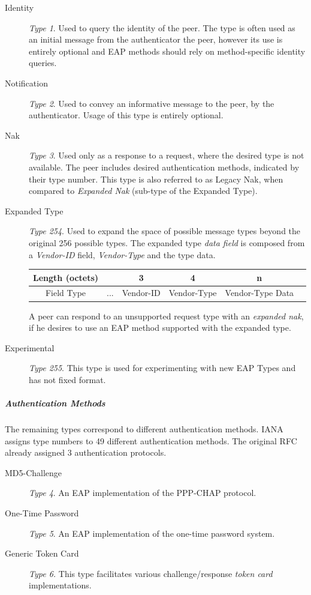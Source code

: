 \begin{description}
	\item[Identity] \textit{Type 1}. Used to query the identity of the peer. The type is often used as an initial message from the authenticator the peer, however its use is entirely optional and EAP methods should rely on method-specific identity queries.
	
	\item[Notification]\textit{Type 2}. Used to convey an informative message to the peer, by the authenticator. Usage of this type is entirely optional.
	\item[Nak]\textit{Type 3}. Used only as a response to a request, where the desired type is not available.
	The peer includes desired authentication methods, indicated by their type number.
	This type is also referred to as Legacy Nak, when compared to \textit{Expanded Nak} (sub-type of the Expanded Type).
	\item[Expanded Type] \textit{Type 254}. 
	Used to expand the space of possible message types beyond the original 256 possible types.
	The expanded type \textit{data field} is composed from a \textit{Vendor-ID} field, \textit{Vendor-Type} and the type data.
	\bigskip
	\begin{center}
		\begin{tabular}{|c|c|c|c|c|c|}
		\cline{2-5}
		\hline
		Length (octets) & & 3 & 4 & n\\
		\hline
		Field Type & ... & Vendor-ID & Vendor-Type & Vendor-Type Data\\
		\hline
		\end{tabular}
	\end{center}
	\bigskip
	A peer can respond to an unsupported request type with an \textit{expanded nak}, if he desires to use an EAP method supported with the expanded type.
	\item[Experimental] \textit{Type 255}. This type is used for experimenting with new EAP Types and has not fixed format.
\end{description}

\subparagraph{Authentication Methods}
The remaining types correspond to different authentication methods.
IANA \cite{joseph2004eap} assigns type numbers to 49 different authentication methods.
The original RFC \cite{aboba2004extensible} already assigned 3 authentication protocols.

\begin{description}
	\item[MD5-Challenge] \textit{Type 4}. An EAP implementation of the \cite{simon2008eap} PPP-CHAP protocol.
	\item[One-Time Password] \textit{Type 5}. An EAP implementation of the \cite{haller1998one} one-time password system.
	\item[Generic Token Card] \textit{Type 6.} This type facilitates various challenge/response \textit{token card} implementations.
\end{description}

